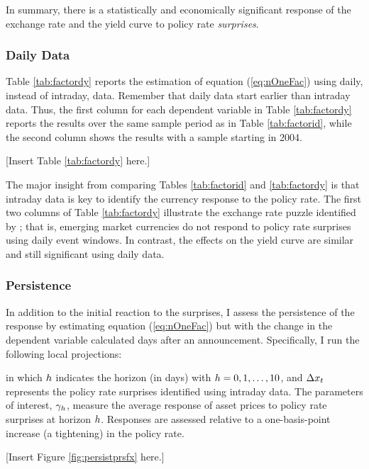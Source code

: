 \documentclass[a4paper,12pt]{article} 		%
\begin{document}
In summary, there is a statistically and economically significant response of the exchange rate and the yield curve to policy rate \textit{surprises}. 

\sectitlespace
\subsubsection{Daily Data}
\sectitlespace
Table \ref{tab:factordy} reports the estimation of equation (\ref{eq:nOneFac}) using daily, instead of intraday, data. Remember that daily data start earlier than intraday data. Thus, the first column for each dependent variable in Table \ref{tab:factordy} reports the results over the same sample period as in Table \ref{tab:factorid}, while the second column shows the results with a sample starting in 2004.

\begin{center}
	[Insert Table \ref{tab:factordy} here.]
\end{center}

The major insight from comparing Tables \ref{tab:factorid} and \ref{tab:factordy} is that intraday data is key to identify the currency response to the policy rate. The first two columns of Table \ref{tab:factordy} illustrate the exchange rate puzzle identified by \textcite{Kohlscheen:2014}; that is, emerging market currencies do not respond to policy rate surprises using daily event windows. In contrast, the effects on the yield curve are similar and still significant using daily data. 

\sectitlespace
\subsubsection{Persistence}
\sectitlespace
In addition to the initial reaction to the surprises, I assess the persistence of the response by estimating equation (\ref{eq:nOneFac}) but with the change in the dependent variable calculated days after an announcement. Specifically, I run the following local projections:

\noindent in which \(h\) indicates the horizon (in days) with \(h = 0, 1, \ldots, 10\), and \(\Delta x_{t}\) represents the policy rate surprises identified using intraday data. The parameters of interest, \(\gamma_{h}\), measure the average response of asset prices to policy rate surprises at horizon \(h\). Responses are assessed relative to a one-basis-point increase (a tightening) in the policy rate. 

\begin{center}
	[Insert Figure \ref{fig:persistprsfx} here.]
\end{center}
\end{document}

